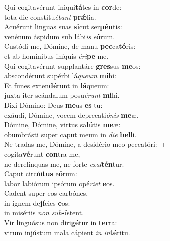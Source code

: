 \evenverse Qui cogitavérunt iniqui\textbf{tá}tes in \textbf{cor}de:~\*\\
\evenverse tota die constitu\textit{é}\textit{bant} \textbf{prǽ}lia.\\
\oddverse Acuérunt linguas suas \textbf{si}cut ser\textbf{pén}tis:~\*\\
\oddverse venénum áspidum sub lábi\textit{is} \textit{e}\textbf{ó}rum.\\
\evenverse Custódi me, Dómine, de manu \textbf{pec}ca\textbf{tó}ris:~\*\\
\evenverse et ab homínibus iníquis \textit{é}\textit{ri}\textbf{pe} me.\\
\oddverse Qui cogitavérunt supplantáre \textbf{gres}sus \textbf{me}os:~\*\\
\oddverse abscondérunt supérbi lá\textit{que}\textit{um} \textbf{mi}hi:\\
\evenverse Et funes exten\textbf{dé}runt in \textbf{lá}queum:~\*\\
\evenverse juxta iter scándalum posu\textit{é}\textit{runt} \textbf{mi}hi.\\
\oddverse Dixi Dómino: Deus \textbf{me}us \textbf{es} tu:~\*\\
\oddverse exáudi, Dómine, vocem deprecati\textit{ó}\textit{nis} \textbf{me}æ.\\
\evenverse Dómine, Dómine, virtus sa\textbf{lú}tis \textbf{me}æ:~\*\\
\evenverse obumbrásti super caput meum in \textit{di}\textit{e} \textbf{bel}li.\\
\oddverse Ne tradas me, Dómine, a desidério meo peccatóri:~+\\
\oddverse  cogita\textbf{vé}runt \textbf{con}tra me,~\*\\
\oddverse ne derelínquas me, ne forte \textit{e}\textit{xal}\textbf{tén}tur.\\
\evenverse Caput circúi\textbf{tus} e\textbf{ó}rum:~\*\\
\evenverse labor labiórum ipsórum opé\textit{ri}\textit{et} \textbf{e}os.\\
\oddverse Cadent super eos carbónes,~+\\
\oddverse  in ignem de\textbf{jí}cies \textbf{e}os:~\*\\
\oddverse in misériis \textit{non} \textit{sub}\textbf{sí}stent.\\
\evenverse Vir linguósus non diri\textbf{gé}tur in \textbf{ter}ra:~\*\\
\evenverse virum injústum mala cápient \textit{in} \textit{in}\textbf{té}ritu.\\
